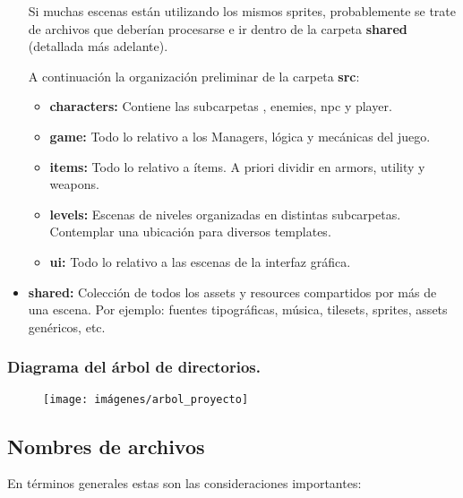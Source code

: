 \begin{itemize}
Si muchas escenas están utilizando los mismos sprites, probablemente se trate de archivos que deberían procesarse e ir dentro de la carpeta \textbf{shared} (detallada más adelante).

A continuación la organización preliminar de la carpeta \textbf{src}:

\begin{itemize}
	\item \textbf{characters:} Contiene las subcarpetas , enemies, npc y player.

	\item \textbf{game:} Todo lo relativo a los Managers, lógica y mecánicas del juego.

	\item \textbf{items:} Todo lo relativo a ítems. A priori dividir en armors, utility y weapons.

	\item \textbf{levels:} Escenas de niveles organizadas en distintas subcarpetas. Contemplar una ubicación para diversos templates.

	\item \textbf{ui:} Todo lo relativo a las escenas de la interfaz gráfica.
\end{itemize}

\item \textbf{shared:} Colección de todos los assets y resources compartidos por más de una escena. Por ejemplo: fuentes tipográficas, música, tilesets, sprites, assets genéricos, etc.
\end{itemize}

\subsubsection*{Diagrama del árbol de directorios.}
\begin{figure}[H]
\centering
\texttt{[image: imágenes/arbol\_proyecto]}
\label{fig:arbolproyecto}
\end{figure}


\subsection{Nombres de archivos}\label{organizacion:nombres-de-archivos}

En términos generales estas son las consideraciones importantes:

